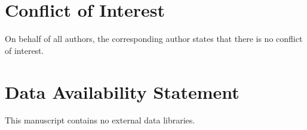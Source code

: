 \documentclass{artjlt}
\newcommand{\?}{\textbackslash}
\begin{document}
\section*{Conflict of Interest}
On behalf of all authors, the corresponding author states that there is no conflict of interest.
\section*{Data Availability Statement}
This manuscript contains no external data libraries.
\end{document}
